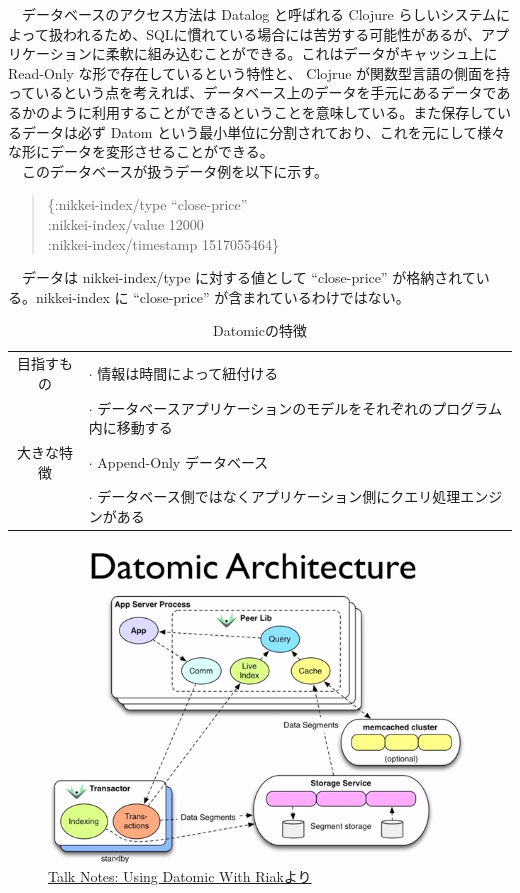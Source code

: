 \documentclass{scrartcl}
\begin{document}
　データベースのアクセス方法は Datalog と呼ばれる Clojure らしいシステムによって扱われるため、SQLに慣れている場合には苦労する可能性があるが、アプリケーションに柔軟に組み込むことができる。これはデータがキャッシュ上に Read-Only な形で存在しているという特性と、 Clojrue が関数型言語の側面を持っているという点を考えれば、データベース上のデータを手元にあるデータであるかのように利用することができるということを意味している。また保存しているデータは必ず Datom という最小単位に分割されており、これを元にして様々な形にデータを変形させることができる。\\
　このデータベースが扱うデータ例を以下に示す。\\

\begin{verse}
\{:nikkei-index/type ``close-price''\\
\hspace*{1em}:nikkei-index/value 12000\\
\hspace*{1em}:nikkei-index/timestamp 1517055464\}\\
\end{verse}
　データは nikkei-index/type に対する値として ``close-price'' が格納されている。nikkei-index に ``close-price'' が含まれているわけではない。\\

\begin{table}
\caption{Datomicの特徴}
\centering
\begin{tabular}{|c|l|}
\hline
目指すもの & \(\cdot\) 情報は時間によって紐付ける\\
 & \(\cdot\) データベースアプリケーションのモデルをそれぞれのプログラム内に移動する\\
\hline
大きな特徴 & \(\cdot\) Append-Only データベース\\
 & \(\cdot\) データベース側ではなくアプリケーション側にクエリ処理エンジンがある\\
\hline
\end{tabular}
\end{table}

\begin{figure}[htbp]
\centering
\includegraphics[width=15cm]{./datomic.png}
\caption{\href{http://endot.org/notes/2014-01-10-using-datomic-with-riak/datomic.png}{Talk Notes: Using Datomic With Riakより}}
\end{figure}
\end{document}
